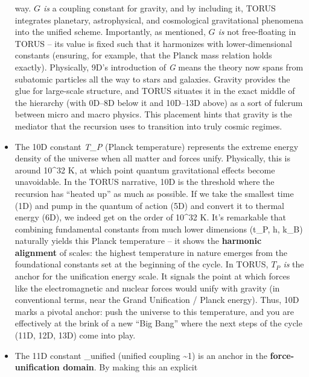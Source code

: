 \documentclass[
]{article}
\begin{document}
\begin{itemize}
  way. \emph{$G$ is} a coupling constant for gravity, and by including it,
  TORUS integrates planetary, astrophysical, and cosmological
  gravitational phenomena into the unified scheme. Importantly, as
  mentioned, \emph{$G$ is} not free-floating in TORUS -- its value is
  fixed such that it harmonizes with lower-dimensional constants
  (ensuring, for example, that the Planck mass relation holds
  exactly)\hspace{0pt}. Physically, 9D's introduction of \emph{G} means
  the theory now spans from subatomic particles all the way to stars and
  galaxies. Gravity provides the glue for large-scale structure, and
  TORUS situates it in the exact middle of the hierarchy (with 0D--8D
  below it and 10D--13D above) as a sort of fulcrum between micro and
  macro physics. This placement hints that gravity is the mediator that
  the recursion uses to transition into truly cosmic regimes.
\item
  The 10D constant
  \emph{T_{P}{}} (Planck
  temperature) represents the extreme energy density of the universe
  when all matter and forces unify. Physically, this is around 10\^{}32
  K, at which point quantum gravitational effects become unavoidable. In
  the TORUS narrative, 10D is the threshold where the recursion has
  ``heated up'' as much as possible\hspace{0pt}. If we take the smallest
  time (1D) and pump in the quantum of action (5D) and convert it to
  thermal energy (6D), we indeed get on the order of 10\^{}32
  K\hspace{0pt}. It's remarkable that combining fundamental constants
  from much lower dimensions
  (t_{P}, h,
  k_{B}) naturally
  yields this Planck temperature -- it shows the \textbf{harmonic
  alignment} of scales: the highest temperature in nature emerges from
  the foundational constants set at the beginning of the
  cycle\hspace{0pt}. In TORUS,
  \emph{$T_{P}{}$ is} the
  anchor for the unification energy scale. It signals the point at which
  forces like the electromagnetic and nuclear forces would unify with
  gravity (in conventional terms, near the Grand Unification / Planck
  energy). Thus, 10D marks a pivotal anchor: push the universe to this
  temperature, and you are effectively at the brink of a new ``Big
  Bang'' where the next steps of the cycle (11D, 12D, 13D) come into
  play.
\item
  The 11D constant
  \alpha_{unified}{} (unified
  coupling \textasciitilde1) is an anchor in the
  \textbf{force-unification domain}. By making this an explicit

\end{itemize}
\end{document}
